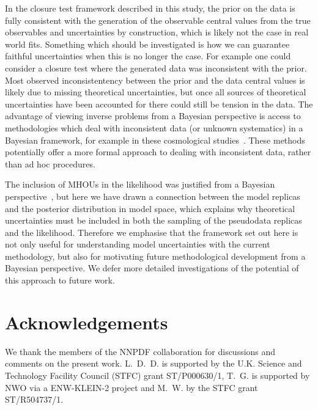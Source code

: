 In the closure test framework described in this study, the prior on the data is
fully consistent with the generation of the observable central values from the
true observables and uncertainties by construction, which is likely not the case
in real world fits. Something which should be investigated is how we can
guarantee faithful uncertainties when this is no longer the case. For example
one could consider a closure test where the generated data was inconsistent with
the prior. Most observed inconsistentency between the prior and the data central
values is likely due to missing theoretical uncertainties, but once all sources
of theoretical uncertainties have been accounted for there could still be
tension in the data. The advantage of viewing inverse problems from a Bayesian
perspective is access to methodologies which deal with inconsistent data (or
unknown systematics) in a Bayesian framework, for example in these cosmological
studies~\cite{Luis_Bernal_2018,Hobson_2002}. These methods potentially offer a
more formal approach to dealing with inconsistent data, rather than ad hoc
procedures.

The inclusion of MHOUs in the likelihood was justified from a Bayesian
perspective~\cite{AbdulKhalek:2019ihb}, but here we have drawn a connection
between the model replicas and the posterior distribution in model space, which
explains why theoretical uncertainties must be included in both the sampling of
the pseudodata replicas and the likelihood. Therefore we emphasise that the
framework set out here is not only useful for understanding model uncertainties
with the current methodology, but also for motivating future methodological
development from a Bayesian perspective. We defer more detailed investigations
of the potential of this approach to future work. 

\section*{Acknowledgements}
We thank the members of the NNPDF collaboration for discussions and comments on the present work. 
L.~D.~D. is supported by the U.K. Science and Technology Facility Council
(STFC) grant ST/P000630/1, T.~G. is supported by NWO via a ENW-KLEIN-2 project and
M.~W. by the STFC grant ST/R504737/1.
